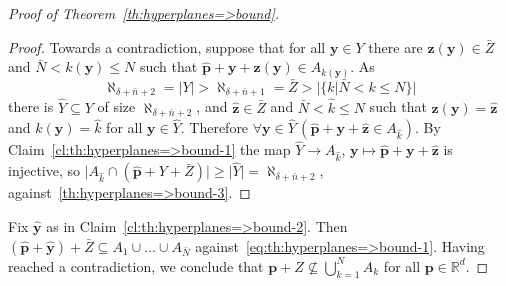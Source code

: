 \documentclass[12pt]{amsart}
\newcommand{\FORALL}[1]{\forall {#1} \, }
\newcommand{\R}{\mathbb{R}}	%
\newcommand{\Mid}{\boldsymbol\mid}			%
\newcommand{\setof}[2]{\mathopen \{{#1}\Mid{#2} \mathclose\}} %
\newcommand{\card}[1]{\mathopen | #1 \mathclose |}		%
\theoremstyle{plain}
\theoremstyle{definition}
\theoremstyle{remark}
\begin{document}
\begin{proof}[Proof of Theorem~\ref{th:hyperplanes=>bound}]
\begin{proof}
Towards a contradiction, suppose that for all \( \mathbf{y} \in Y \) there are \( \mathbf{z} ( \mathbf{y} ) \in \bar{Z} \) and \( \bar{N} < k ( \mathbf{y} ) \leq N \) such that \( \hat{\mathbf{p}} + \mathbf{y} + \mathbf{z} ( \mathbf{y} ) \in A_{ k ( \mathbf{y} ) } \).
As 
\[
 \aleph_{ \delta + \bar{n} + 2 } = \card{Y} > \aleph_{ \delta + \bar{n} + 1 } =\bar{Z} > \card{\setof{ k }{ \bar{N} < k \leq N}} 
\] 
there is \( \hat{Y} \subseteq Y \) of size \( \aleph_{ \delta + \bar{n} + 2 } \), and \( \hat{\mathbf{z}} \in \bar{Z} \) and \( \bar{N} < \hat{k} \leq N \) such that \( \mathbf{z} ( \mathbf{y} ) = \hat{\mathbf{z}} \) and \( k ( \mathbf{y} ) = \hat{k} \) for all \( \mathbf{y} \in \hat{Y} \).
Therefore \( \FORALL{ \mathbf{y} \in \hat{Y} } ( \hat{\mathbf{p}} + \mathbf{y} + \hat{\mathbf{z}} \in A_{\hat{k}} ) \).
By Claim~\ref{cl:th:hyperplanes=>bound-1} the map \( \hat{Y} \to A_{\hat{k}} \), \( \mathbf{y} \mapsto \hat{\mathbf{p}} + \mathbf{y} + \hat{\mathbf{z}} \) is injective, so \( \card{ A_{\hat{k}} \cap ( \hat{\mathbf{p}} + Y + \bar{Z} ) } \geq \card{ \hat{Y} } = \aleph _{ \delta + \bar{n} + 2 } \), against~\eqref{th:hyperplanes=>bound-3}.
\end{proof}

Fix \( \hat{\mathbf{y}} \) as in Claim~\ref{cl:th:hyperplanes=>bound-2}.
Then \( ( \hat{\mathbf{p}} + \hat{ \mathbf{y} } ) + \bar{Z} \subseteq A_1 \cup \dots \cup A_{\bar{N}} \) against~\eqref{eq:th:hyperplanes=>bound-1}.
Having reached a contradiction, we conclude that \( \mathbf{p} + Z \nsubseteq \bigcup_{ k = 1 }^ N A_k \) for all \( \mathbf{p} \in \R^d \).
\end{proof}
\end{document}
